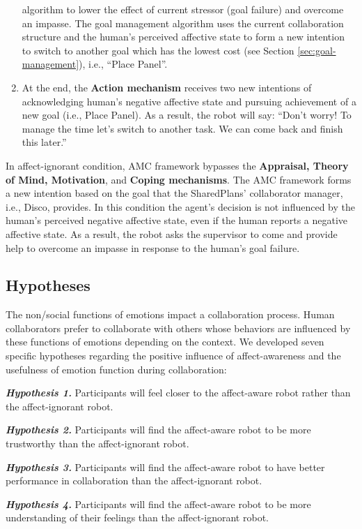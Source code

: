 \documentclass[12pt]{report}
\begin{document}
\begin{enumerate}
  algorithm to lower the effect of current stressor (goal failure) and overcome
  an impasse. The goal management algorithm uses the current collaboration
  structure and the human's perceived affective state to form a new intention to
  switch to another goal which has the lowest cost (see Section
  \ref{sec:goal-management}), i.e., ``Place Panel''.
  \item At the end, the \textbf{Action mechanism} receives two new intentions of
  acknowledging human's negative affective state and pursuing achievement of a
  new goal (i.e., Place Panel). As a result, the robot will say: ``Don't
  worry! To manage the time let's switch to another task. We can come back and
  finish this later.''
\end{enumerate}

In affect-ignorant condition, AMC framework bypasses the \textbf{Appraisal,
Theory of Mind, Motivation}, and \textbf{Coping mechanisms}. The AMC framework
forms a new intention based on the goal that the SharedPlans' collaborator
manager, i.e., Disco, provides. In this condition the agent's decision is not
influenced by the human's perceived negative affective state, even if the human
reports a negative affective state. As a result, the robot asks the supervisor
to come and provide help to overcome an impasse in response to the human's goal
failure.

\subsection{Hypotheses}
\label{sec:hypotheses}
The non/social functions of emotions impact a collaboration process. Human
collaborators prefer to collaborate with others whose behaviors are influenced
by these functions of emotions depending on the context. We developed seven
specific hypotheses regarding the positive influence of affect-awareness and
the usefulness of emotion function during collaboration:

\textit{\textbf{Hypothesis 1.}} Participants will feel closer to the affect-aware
robot rather than the affect-ignorant robot.

\textit{\textbf{Hypothesis 2.}} Participants will find the affect-aware robot to be
more trustworthy than the affect-ignorant robot.

\textit{\textbf{Hypothesis 3.}} Participants will find the affect-aware robot to
have better performance in collaboration than the affect-ignorant robot.

\textit{\textbf{Hypothesis 4.}} Participants will find the affect-aware robot to be
more understanding of their feelings than the affect-ignorant robot.
\end{document}
